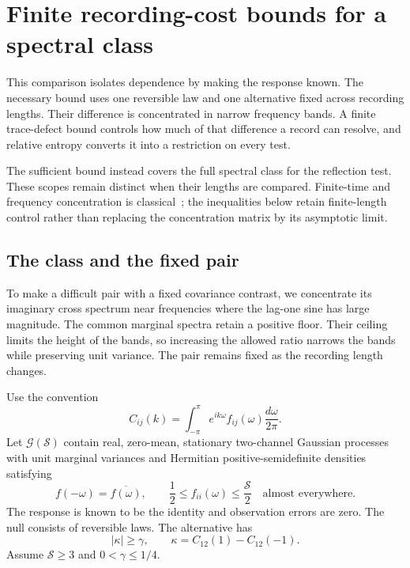 \section{Finite recording-cost bounds for a spectral class}
\label{cost16:section}

This comparison isolates dependence by making the response known. The necessary bound uses one reversible law and one alternative fixed across recording lengths. Their difference is concentrated in narrow frequency bands. A finite trace-defect bound controls how much of that difference a record can resolve, and relative entropy converts it into a restriction on every test.

The sufficient bound instead covers the full spectral class for the reflection test. These scopes remain distinct when their lengths are compared. Finite-time and frequency concentration is classical~\cite{slepian1978,landauwidom1980}; the inequalities below retain finite-length control rather than replacing the concentration matrix by its asymptotic limit.

\subsection{The class and the fixed pair}

To make a difficult pair with a fixed covariance contrast, we concentrate its imaginary cross spectrum near frequencies where the lag-one sine has large magnitude. The common marginal spectra retain a positive floor. Their ceiling limits the height of the bands, so increasing the allowed ratio narrows the bands while preserving unit variance. The pair remains fixed as the recording length changes.

Use the convention
\[
 C_{ij}(k)=\int_{-\pi}^{\pi}e^{ik\omega}f_{ij}(\omega)
                          \frac{d\omega}{2\pi}.
\]
Let $\mathcal G(\mathcal S)$ contain real, zero-mean, stationary two-channel Gaussian processes with unit marginal variances and Hermitian positive-semidefinite densities satisfying
\begin{equation}
 f(-\omega)=\overline{f(\omega)},\qquad
 \frac12\le f_{ii}(\omega)\le\frac{\mathcal S}{2}
 \quad\text{almost everywhere}.
 \label{cost16:class}
\end{equation}
The response is known to be the identity and observation errors are zero. The null consists of reversible laws. The alternative has
\begin{equation}
 |\kappa|\ge\gamma,
 \qquad
 \kappa=C_{12}(1)-C_{12}(-1).
 \label{cost16:gap}
\end{equation}
Assume $\mathcal S\ge3$ and $0<\gamma\le1/4$.

